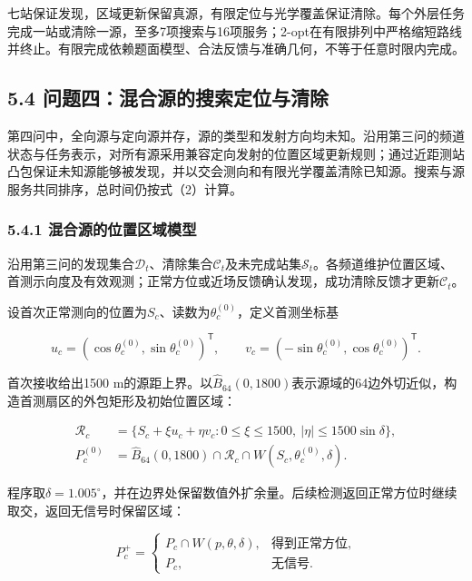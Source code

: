 \documentclass[UTF8,fontset=none,zihao=-4,a4paper]{ctexart}
\begin{document}
七站保证发现，区域更新保留真源，有限定位与光学覆盖保证清除。每个外层任务完成一站或清除一源，至多7项搜索与16项服务；2-opt在有限排列中严格缩短路线并终止。有限完成依赖题面模型、合法反馈与准确几何，不等于任意时限内完成。

\FloatBarrier
\subsection{5.4 问题四：混合源的搜索定位与清除}\label{ux95eeux9898ux56dbux6df7ux5408ux6e90ux7684ux641cux7d22ux5b9aux4f4dux4e0eux6e05ux9664}

第四问中，全向源与定向源并存，源的类型和发射方向均未知。沿用第三问的频道状态与任务表示，对所有源采用兼容定向发射的位置区域更新规则；通过近距测站凸包保证未知源能够被发现，并以交会测向和有限光学覆盖清除已知源。搜索与源服务共同排序，总时间仍按式（2）计算。

\subsubsection{5.4.1 混合源的位置区域模型}\label{ux6df7ux5408ux6e90ux7684ux4f4dux7f6eux533aux57dfux6a21ux578b}

沿用第三问的发现集合\(\mathcal D_t\)、清除集合\(\mathcal C_t\)及未完成站集\(\mathcal S_t\)。各频道维护位置区域、首测示向度及有效观测；正常方位或近场反馈确认发现，成功清除反馈才更新\(\mathcal C_t\)。

设首次正常测向的位置为\(S_c\)、读数为\(\theta_c^{(0)}\)，定义首测坐标基

\[
u_c=(\cos\theta_c^{(0)},\sin\theta_c^{(0)})^{\mathsf T},
\qquad v_c=(-\sin\theta_c^{(0)},\cos\theta_c^{(0)})^{\mathsf T}.
\]

首次接收给出1500 m的源距上界。以\(\widehat B_{64}(0,1800)\)表示源域的64边外切近似，构造首测扇区的外包矩形及初始位置区域：

\[
\begin{aligned}
\mathcal R_c&=\{S_c+\xi u_c+\eta v_c:
0\le\xi\le1500,\ |\eta|\le1500\sin\delta\},\\
P_c^{(0)}&=\widehat B_{64}(0,1800)\cap\mathcal R_c
\cap W(S_c,\theta_c^{(0)},\delta).
\end{aligned}
\]

程序取\(\delta=1.005^\circ\)，并在边界处保留数值外扩余量。后续检测返回正常方位时继续取交，返回无信号时保留区域：

\[
P_c^+=\begin{cases}
P_c\cap W(p,\theta,\delta),&\text{得到正常方位},\\
P_c,&\text{无信号}.
\end{cases}
\]
\end{document}

